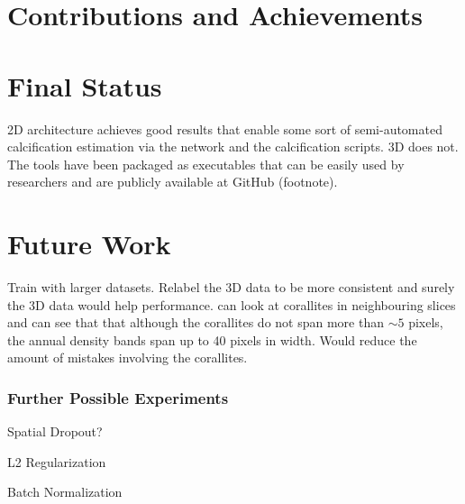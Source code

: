 \section{Contributions and Achievements}

\lipsum[1]
\lipsum[2]
\lipsum[3]

\section{Final Status}

2D architecture achieves good results that enable some sort of semi-automated calcification estimation via the network and the calcification scripts. 3D does not. The tools have been packaged as executables that can be easily used by researchers and are publicly available at GitHub (footnote). 

\lipsum[4]
\lipsum[5]

\section{Future Work}

Train with larger datasets. Relabel the 3D data to be more consistent and surely the 3D data would help performance. can look at corallites in neighbouring slices and can see that that although the corallites do not span more than ${\sim}5$ pixels, the annual density bands span up to 40 pixels in width. Would reduce the amount of mistakes involving the corallites.

\lipsum[6]

\subsubsection{Further Possible Experiments}

Spatial Dropout?

L2 Regularization

Batch Normalization



